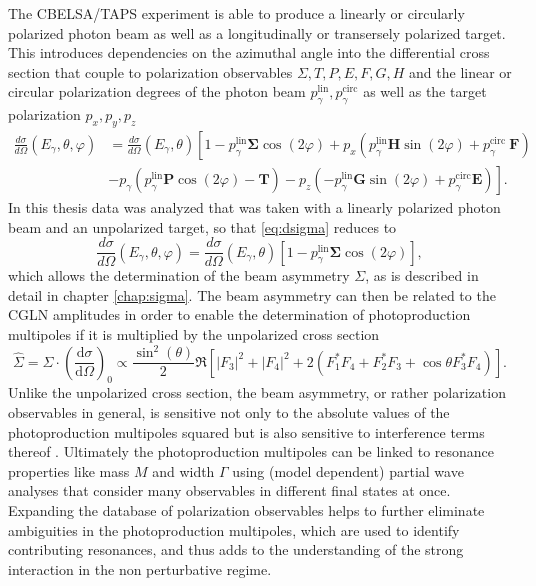 \noindent The CBELSA/TAPS experiment is able to produce a linearly or circularly polarized photon beam as well as a longitudinally or transersely polarized target. This introduces dependencies on the azimuthal angle into the differential cross section that couple to polarization observables $\Sigma,T,P,E,F,G,H$ and the linear or circular polarization degrees of the photon beam $p_\gamma^\text{lin},p_\gamma^\text{circ}$ as well as the target polarization $p_x,p_y,p_z$\cite{san}
\begin{equation}
	\begin{aligned}
		\frac{d \sigma}{d \Omega}\left(E_\gamma, \theta, \varphi\right) &=\frac{d \sigma}{d \Omega}\left(E_\gamma, \theta\right)\left[1-p_{\gamma}^{\operatorname{lin}} \mathbf{\Sigma} \cos (2 \varphi)+p_{x}\left(p_{\gamma}^{\operatorname{lin}} \mathbf{H} \sin (2 \varphi)+p_{\gamma}^{\text {circ }} \mathbf{F}\right)\right.\\
		&\left.-p_{\gamma}\left(p_{\gamma}^{\operatorname{lin}} \mathbf{P} \cos (2 \varphi)-\mathbf{T}\right)-p_{z}\left(-p_{\gamma}^{\operatorname{lin}} \mathbf{G} \sin (2 \varphi)+p_{\gamma}^{\mathrm{circ}} \mathbf{E}\right)\right].
	\end{aligned}
	\label{eq:dsigma}
\end{equation}
In this thesis data was analyzed that was taken with a linearly polarized photon beam and an unpolarized target, so that \eqref{eq:dsigma} reduces to 
\begin{equation}
	\frac{d \sigma}{d \Omega}\left(E_\gamma, \theta, \varphi\right)=\frac{d \sigma}{d \Omega}\left(E_\gamma, \theta\right)\left[1-p_{\gamma}^{\operatorname{lin}} \boldsymbol{\Sigma} \cos (2 \varphi)\right],
\end{equation}
which allows the determination of the beam asymmetry $\Sigma$, as is described in detail in chapter \ref{chap:sigma}. The beam asymmetry can then be related to the CGLN amplitudes in order to enable the determination of photoproduction multipoles if it is multiplied by the unpolarized cross section \cite{fasano}
\begin{equation}
	\widehat{\Sigma}=\Sigma\cdot\left(\frac{\text{d}\sigma}{\text{d}\Omega}\right)_0\propto\frac{\sin^2(\theta)}{2}\Re \left[\left|F_3\right|^2+\left|F_4\right|^2+2\left(F_1^*F_4+F_2^*F_3+\cos\theta F_3^*F_4\right)\right].
\end{equation}
Unlike the unpolarized cross section, the beam asymmetry, or rather polarization observables in general, is sensitive not only to the absolute values of the photoproduction multipoles squared but is also sensitive to interference terms thereof \cite{farahphd,Wunderlich_2017}. Ultimately the photoproduction multipoles can be linked to resonance properties like mass $M$ and width $\Gamma$ using (model dependent) partial wave analyses that consider many observables in different final states at once. Expanding the database of polarization observables helps to further eliminate ambiguities in the photoproduction multipoles, which are used to identify contributing resonances, and thus adds to the understanding of the strong interaction in the non perturbative regime.
